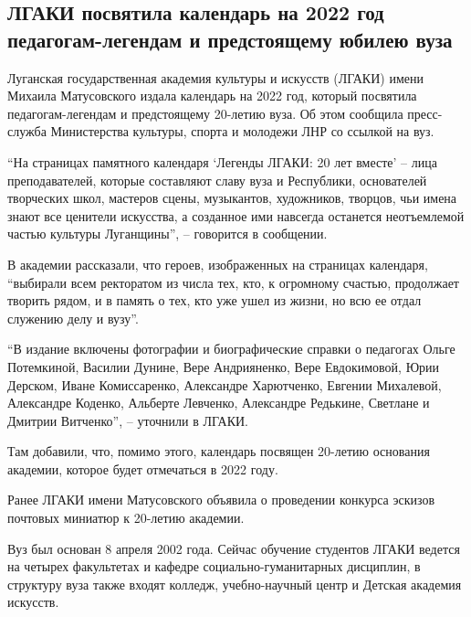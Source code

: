  
 
 
 
 
\subsection{ЛГАКИ посвятила календарь на 2022 год педагогам-легендам и предстоящему юбилею вуза}
\label{sec:28_12_2021.stz.news.lnr.lug_info.2.lgaki_kalendar}

Луганская государственная академия культуры и искусств (ЛГАКИ) имени Михаила
Матусовского издала календарь на 2022 год, который посвятила педагогам-легендам
и предстоящему 20-летию вуза. Об этом сообщила пресс-служба Министерства
культуры, спорта и молодежи ЛНР со ссылкой на вуз.


\enquote{На страницах памятного календаря \enquote{Легенды ЛГАКИ: 20 лет
вместе} – лица преподавателей, которые составляют славу вуза и Республики,
основателей творческих школ, мастеров сцены, музыкантов, художников, творцов,
чьи имена знают все ценители искусства, а созданное ими навсегда останется
неотъемлемой частью культуры Луганщины}, – говорится в сообщении.


В академии рассказали, что героев, изображенных на страницах календаря,
\enquote{выбирали всем ректоратом из числа тех, кто, к огромному счастью, продолжает
творить рядом, и в память о тех, кто уже ушел из жизни, но всю ее отдал
служению делу и вузу}.

\enquote{В издание включены фотографии и биографические справки о педагогах Ольге
Потемкиной, Василии Дунине, Вере Андрияненко, Вере Евдокимовой, Юрии Дерском,
Иване Комиссаренко, Александре Харютченко, Евгении Михалевой, Александре
Коденко, Альберте Левченко, Александре Редькине, Светлане и Дмитрии Витченко},
– уточнили в ЛГАКИ.

Там добавили, что, помимо этого, календарь посвящен 20-летию основания
академии, которое будет отмечаться в 2022 году.

Ранее ЛГАКИ имени Матусовского объявила о проведении конкурса эскизов почтовых
миниатюр к 20-летию академии.

Вуз был основан 8 апреля 2002 года. Сейчас обучение студентов ЛГАКИ ведется на
четырех факультетах и кафедре социально-гуманитарных дисциплин, в структуру
вуза также входят колледж, учебно-научный центр и Детская академия искусств.
